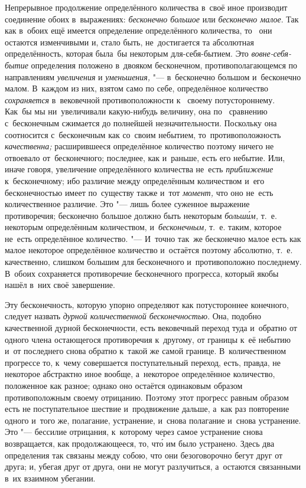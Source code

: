 \begin{midsloppypar}
Непрерывное продолжение определённого количества в~своё иное производит
соединение обоих в~выражениях: {\em бесконечно большое} или {\em бесконечно
малое}. Так как в~обоих ещё имеется определение определённого количества, то~%
они остаются изменчивыми и, стало быть, не~достигается та абсолютная
определённость, которая была~бы некоторым для-себя-бытием. Это
{\em вовне-себя-бытие} определения положено в~двояком бесконечном,
противополагающемся по направлениям {\em увеличения} и {\em уменьшения,} "---
в~бесконечно большом и~бесконечно малом. В~каждом из них, взятом само по себе,
определённое количество {\em сохраняется} в~вековечной противоположности к~%
своему потустороннему. Как~бы мы ни~увеличивали какую-нибудь величину, она по~%
сравнению с~бесконечным сжимается до полнейшей незначительности. Поскольку она
соотносится с~бесконечным как со~своим небытием, то~противоположность
{\em качественна;} расширившееся определённое количество поэтому ничего не~%
отвоевало от~бесконечного; последнее, как и~раньше, есть его небытие. Или,
иначе говоря, увеличение определённого количества не~есть {\em приближение}
к~бесконечному; ибо различие между определённым количеством и~его
бесконечностью имеет по~существу также и~тот {\em момент,} что оно не~есть
количественное различие. Это "--- лишь более суженное выражение противоречия;
бесконечно большое должно быть некоторым {\em больш\'{и}м,} т.~е. некоторым
определённым количеством, и~\textit{бесконечным,} т.~е. таким, которое не~есть
определённое количество. "--- И~точно так~же бесконечно малое есть как малое
некоторое определённое количество и~остаётся поэтому абсолютно, т.~е.
качественно, слишком большим для бесконечного и~противоположно последнему.
В~обоих сохраняется противоречие бесконечного прогресса, который якобы нашёл
в~них своё завершение.
\end{midsloppypar}

Эту бесконечность, которую упорно определяют как потустороннее конечного,
следует назвать {\em дурной количественной бесконечностью}. Она, подобно
качественной дурной бесконечности, есть вековечный переход туда и~обратно от
одного члена остающегося противоречия к~другому, от границы к~её небытию и~от
последнего снова обратно к~такой же самой границе. В~количественном прогрессе
то, к~чему совершается поступательный переход, есть, правда, не некоторое
абстрактно иное вообще, а~некоторое определённое количество, положенное как
разное; однако оно остаётся одинаковым образом противоположным своему
отрицанию. Поэтому этот прогресс равным образом есть не поступательное шествие
и~продвижение дальше, а~как раз повторение одного и~того же, полагание,
устранение, и~снова полагание и~снова устранение. Это "--- бессилие отрицания,
к~которому через самое устранение снова возвращается, как продолжающееся, то,
чт\'{о} им было устранено. Здесь два определения так связаны между собою, что они
безоговорочно бегут друг от друга; и, убегая друг от друга, они не могут
разлучиться, а~остаются связанными в~их взаимном убегании.


